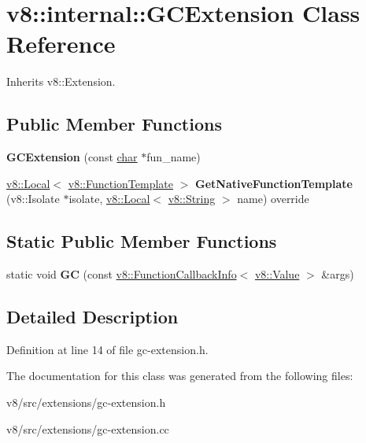 \hypertarget{classv8_1_1internal_1_1GCExtension}{}\section{v8\+:\+:internal\+:\+:G\+C\+Extension Class Reference}
\label{classv8_1_1internal_1_1GCExtension}


Inherits v8\+::\+Extension.

\subsection*{Public Member Functions}
\begin{DoxyCompactItemize}
\item 
\mbox{\label{classv8_1_1internal_1_1GCExtension_af3965f1917f026783534231cac88788f}} 
{\bfseries G\+C\+Extension} (const \mbox{\hyperlink{classchar}{char}} $\ast$fun\+\_\+name)
\item 
\mbox{\label{classv8_1_1internal_1_1GCExtension_a92bd9cbf33543578a7f681520ea57f7c}} 
\mbox{\hyperlink{classv8_1_1Local}{v8\+::\+Local}}$<$ \mbox{\hyperlink{classv8_1_1FunctionTemplate}{v8\+::\+Function\+Template}} $>$ {\bfseries Get\+Native\+Function\+Template} (v8\+::\+Isolate $\ast$isolate, \mbox{\hyperlink{classv8_1_1Local}{v8\+::\+Local}}$<$ \mbox{\hyperlink{classv8_1_1String}{v8\+::\+String}} $>$ name) override
\end{DoxyCompactItemize}
\subsection*{Static Public Member Functions}
\begin{DoxyCompactItemize}
\item 
\mbox{\label{classv8_1_1internal_1_1GCExtension_aa8fedc733aba5b2784fc6e97d191931e}} 
static void {\bfseries GC} (const \mbox{\hyperlink{classv8_1_1FunctionCallbackInfo}{v8\+::\+Function\+Callback\+Info}}$<$ \mbox{\hyperlink{classv8_1_1Value}{v8\+::\+Value}} $>$ \&args)
\end{DoxyCompactItemize}


\subsection{Detailed Description}


Definition at line 14 of file gc-\/extension.\+h.



The documentation for this class was generated from the following files\+:\begin{DoxyCompactItemize}
\item 
v8/src/extensions/gc-\/extension.\+h\item 
v8/src/extensions/gc-\/extension.\+cc\end{DoxyCompactItemize}

